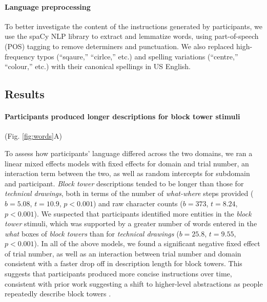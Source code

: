 \documentclass[10pt,letterpaper]{article}
\begin{document}
\paragraph{Language preprocessing} %
To better investigate the content of the instructions generated by participants, we use the spaCy NLP library to extract and lemmatize words, using part-of-speech (POS) tagging to remove determiners and punctuation. We also replaced high-frequency typos (``sqaure,'' ``cirlce,'' etc.) and spelling variations (``centre,'' ``colour,'' etc.) with their canonical spellings in US English.

\subsection{Results}

\paragraph{Participants produced longer descriptions for block tower stimuli}

(Fig. \ref{fig:words}A)

To assess how participants' language differed across the two domains, we ran a linear mixed effects models with fixed effects for domain and trial number, an interaction term between the two, as well as random intercepts for subdomain and participant.
\textit{Block tower} descriptions tended to be longer than those for \textit{technical drawings}, both in terms of the number of \textit{what-where} steps provided ($b=5.08$, $t=10.9$, $p<0.001$) and raw character counts ($b=373$, $t=8.24$, $p<0.001$).
We suspected that participants identified more entities in the \textit{block tower} stimuli, which was supported by a greater number of words entered in the \textit{what} boxes of \textit{block towers} than for \textit{technical drawings} ($b=25.8$, $t=9.55$, $p<0.001$).
In all of the above models, we found a significant negative fixed effect of trial number, as well as an interaction between trial number and domain consistent with a faster drop off in description length for block towers.
This suggests that participants produced more concise instructions over time, consistent with prior work suggesting a shift to higher-level abstractions as people repeatedly describe block towers \cite{mccarthy2021learning}. %
\end{document}
